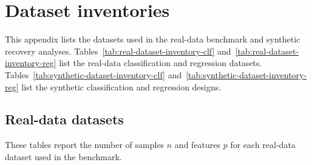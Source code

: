\section{Dataset inventories}
\label{app:dataset-inventory}

This appendix lists the datasets used in the real-data benchmark and synthetic
recovery analyses. Tables~\ref{tab:real-dataset-inventory-clf}
and~\ref{tab:real-dataset-inventory-reg} list the real-data classification and
regression datasets. Tables~\ref{tab:synthetic-dataset-inventory-clf}
and~\ref{tab:synthetic-dataset-inventory-reg} list the synthetic classification
and regression designs.

\subsection{Real-data datasets}

These tables report the number of samples $n$ and features $p$ for each
real-data dataset used in the benchmark.


